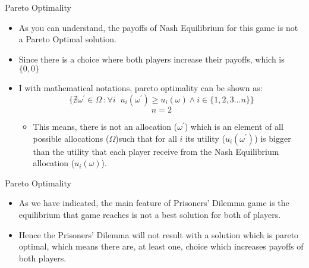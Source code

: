 \documentclass[
  ignorenonframetext,
]{beamer}
\begin{document}
\begin{frame}{Pareto Optimality}
\protect\hypertarget{pareto-optimality-2}{}
\begin{itemize}
  \item As you can understand, the payoffs of Nash Equilibrium for this game is not a Pareto Optimal solution. 
  \item Since there is a choice where both players increase their payoffs, which is $\{0,0\}$
  \item I with mathematical notations, pareto optimality can be shown as:
    $$\{\nexists \omega^{'} \in \Omega\ : \forall i \;\; u_i(\omega^{'} ) \geq u_i(\omega) \wedge i \in \{1,2,3...n\}\}$$
    $$n=2$$
\begin{itemize}
  \item This means, there is not an allocation ($\omega^{'}$) which is an element of all possible allocations ($\Omega$)such that for all $i$ its utility ($u_i(\omega^{'})$) is bigger than the utility that each player receive from the Nash Equilibrium allocation ($u_i(\omega)$).
\end{itemize}
  
\end{itemize}
\end{frame}

\begin{frame}{Pareto Optimality}
\protect\hypertarget{pareto-optimality-3}{}
\begin{itemize}
  \item As we have indicated, the main feature of Prisoners' Dilemma game is the equilibrium that game reaches is not a best solution for both of players. 
  \item Hence the Prisoners' Dilemma will not result with a solution which is pareto optimal, which means there are, at least one, choice which increases payoffs of both players.
\end{itemize}
\end{frame}
\end{document}
